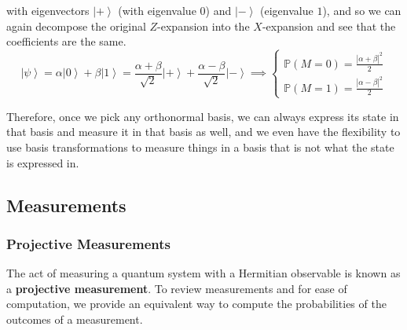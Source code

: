 \documentclass{article}
\newcommand{\ket}[1]{\ensuremath{\left|#1\right\rangle}}
\newcounter{example}[section]
\begin{document}
\begin{example}
      with eigenvectors $\ket{+}$ (with eigenvalue $0$) and $\ket{-}$ (eigenvalue $1$), and so we can again decompose the original $Z$-expansion into the $X$-expansion and see that the coefficients are the same. 
      \begin{equation} 
        \ket{\psi} = \alpha \ket{0} + \beta \ket{1} = \frac{\alpha + \beta}{\sqrt{2}} \ket{+} + \frac{\alpha - \beta}{\sqrt{2}} \ket{-} \implies \begin{cases} \mathbb{P}(M = 0) = \frac{|\alpha + \beta|^2}{2} \\ \mathbb{P}(M = 1) = \frac{|\alpha - \beta|^2}{2} \end{cases}
      \end{equation} 
    \end{example}

    Therefore, once we pick any orthonormal basis, we can always express its state in that basis and measure it in that basis as well, and we even have the flexibility to use basis transformations to measure things in a basis that is not what the state is expressed in. 

  \subsection{Measurements} 

    \subsubsection{Projective Measurements}

      The act of measuring a quantum system with a Hermitian observable is known as a \textbf{projective measurement}. To review measurements and for ease of computation, we provide an equivalent way to compute the probabilities of the outcomes of a measurement. 
\end{document}

